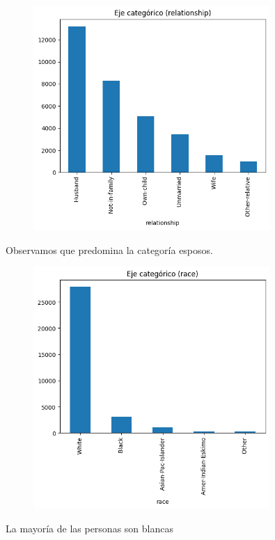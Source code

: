 \documentclass{article}
\begin{document}
	\begin{figure}[H]
		\centering
		\includegraphics[width=0.8\textwidth]{relationship.png}  
	\end{figure}
	
	Observamos que predomina la categoría esposos.
	
	\begin{figure}[H]
		\centering
		\includegraphics[width=0.8\textwidth]{race.png}
	\end{figure}
	
	La mayoría de las personas son blancas
	
\end{document}
